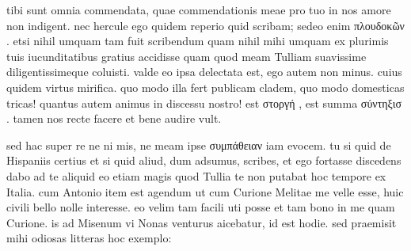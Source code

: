  tibi sunt omnia commendata, quae commendationis meae pro tuo in nos amore non indigent. nec hercule ego quidem reperio quid scribam; sedeo enim πλουδοκῶν . etsi nihil umquam tam fuit scribendum quam nihil mihi umquam ex plurimis tuis iucunditatibus gratius accidisse quam quod meam Tulliam suavissime diligentissimeque coluisti. valde eo ipsa delectata est, ego autem non minus. cuius quidem virtus mirifica. quo modo illa fert publicam cladem, quo modo domesticas tricas! quantus autem animus in discessu nostro! est στοργή , est summa σύντηξισ . tamen nos recte facere et bene audire vult.

 sed hac super re ne ni mis, ne meam ipse συμπάθειαν iam evocem. tu si quid de Hispaniis certius et si quid aliud, dum adsumus, scribes, et ego fortasse discedens dabo ad te aliquid eo etiam magis quod Tullia te non putabat hoc tempore ex Italia. cum Antonio item est agendum ut cum Curione Melitae me velle esse, huic civili bello nolle interesse. eo velim tam facili uti posse et tam bono in me quam Curione. is ad Misenum vi Nonas venturus aicebatur, id est hodie. sed praemisit mihi odiosas litteras hoc exemplo:
